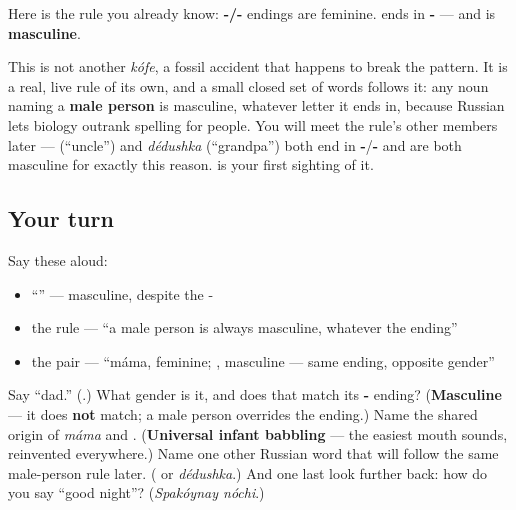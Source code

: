 \begin{grammarlens}[title={Grammar Lens: when biology beats the ending}]
Here is the rule you already know: \textbf{-/-} endings are feminine. \emph{} ends in \textbf{-} — and \emph{} is \textbf{masculine}.

This is not another \emph{kófe}, a fossil accident that happens to break the pattern. It is a real, live rule of its own, and a small closed set of words follows it: any noun naming a \textbf{male person} is masculine, whatever letter it ends in, because Russian lets biology outrank spelling for people. You will meet the rule's other members later — \textbf{} (\textquotedblleft{}uncle\textquotedblright{}) and \emph{dédushka} (\textquotedblleft{}grandpa\textquotedblright{}) both end in \textbf{-}/\textbf{-} and are both masculine for exactly this reason. \emph{} is your first sighting of it.
\end{grammarlens}

\subsection*{Your turn}
Say these aloud:

\begin{itemize}
\raggedright
  \item \textquotedblleft{}\textquotedblright{} — masculine, despite the -
  \item the rule — \textquotedblleft{}a male person is always masculine, whatever the ending\textquotedblright{}
  \item the pair — \textquotedblleft{}máma, feminine; , masculine — same ending, opposite gender\textquotedblright{}
\end{itemize}

\begin{tcolorbox}[breakable,colback=teal!4,colframe=teal!35!black,title={Before you move on}]
Say \textquotedblleft{}dad.\textquotedblright{} (\textbf{}.) What gender is it, and does that match its \textbf{-} ending? (\textbf{Masculine} — it does \textbf{not} match; a male person overrides the ending.) Name the shared origin of \emph{máma} and \emph{}. (\textbf{Universal infant babbling} — the easiest mouth sounds, reinvented everywhere.) Name one other Russian word that will follow the same male-person rule later. (\textbf{} or \emph{dédushka}.) And one last look further back: how do you say \textquotedblleft{}good night\textquotedblright{}? (\emph{Spakóynay nóchi}.)
\end{tcolorbox}

